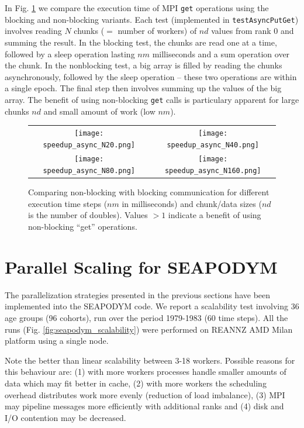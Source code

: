 \documentclass[a4paper,oneside,12pt]{article}
\begin{document}
In Fig. \ref{fig:async} we compare the  execution time of MPI \verb|get| operations using 
the blocking and non-blocking variants. Each test (implemented in \verb|testAsyncPutGet|) involves reading $N$ chunks ($=$ number of workers) 
of $nd$ values from rank 0 and summing the result. In the blocking test, the chunks are read one at a 
time, followed by a sleep operation lasting $nm$ milliseconds and a sum operation over the chunk. 
In the nonblocking test, a big array is filled by reading the chunks asynchronously, followed by the 
sleep operation -- these two operations are within a single epoch. The final step then involves summing up the values
of the big array. The benefit of using non-blocking \verb|get| calls is particulary apparent for large chunks 
$nd$ and small amount of work (low $nm$).

\begin{figure}
\begin{tabular}{cc}
      \texttt{[image: speedup\_async\_N20.png]} & \texttt{[image: speedup\_async\_N40.png]} \\
      \texttt{[image: speedup\_async\_N80.png]} & \texttt{[image: speedup\_async\_N160.png]} \\
\end{tabular}
\caption{Comparing non-blocking with blocking communication for different execution time steps ($nm$ in milliseconds) 
and chunk/data sizes ($nd$ is the number of doubles). Values $> 1$ indicate a benefit of using non-blocking ``get'' operations.}
\label{fig:async}
\end{figure}

\section{Parallel Scaling for SEAPODYM}

The parallelization strategies presented in the previous sections have been implemented into the SEAPODYM code. 
We report a scalability test involving 36 age groups (96 cohorts), run over the period 1979-1983 (60 time steps). 
All the runs (Fig. \ref{fig:seapodym_scalability}) were performed on REANNZ AMD Milan
platform using a single node. 

Note the better than linear scalability between 3-18 workers. Possible reasons for this behaviour are:
(1) with more workers processes handle smaller amounts of data which may fit better in cache, (2) with more workers the 
scheduling overhead distributes work more evenly (reduction of load imbalance), (3) MPI may pipeline messages more efficiently with 
additional ranks and (4) disk and I/O contention may be decreased.
\end{document}
